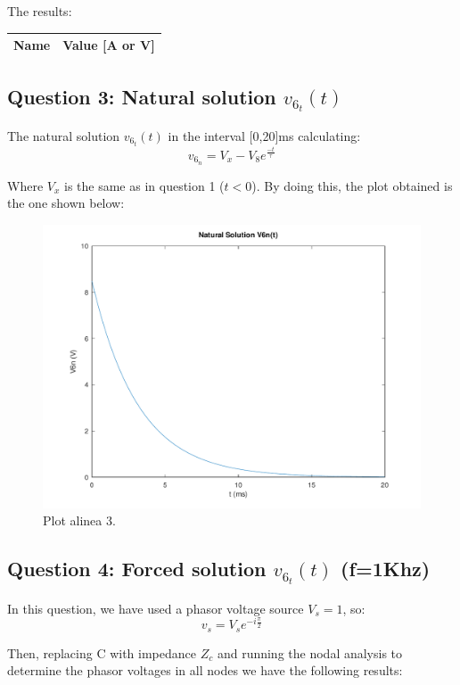 The results:

\begin{center}
  \begin{tabular}{ | c | c | }
    \hline    
    {\bf Name} & {\bf Value [A or V]} \\ \hline
    
    \hline
  \end{tabular}
\end{center}


\subsection{Question 3: Natural solution $v_{6_t}(t)$}
The natural solution $v_{6_t}(t)$ in the interval [0,20]ms calculating:
\begin{equation}
     v_{6_n} = {V_x-V_8}e^{\frac{-t}{\tau}}
\end{equation}\par
Where $V_x$ is the same as in question 1 ($t<0$).
By doing this, the plot obtained is the one shown below:

\begin{figure}[H] \centering
\includegraphics[width=0.7\linewidth]{../mat/alinea3.pdf}
\caption{Plot alinea 3.}
\label{fig:plot3}
\end{figure}


\subsection{Question 4: Forced solution $v_{6_t}(t)$ (f=1Khz)}
In this question, we have used a phasor voltage source $V_s = 1$, so:
\begin{equation}
     v_s = {V_s}e^{-i\frac{\pi}{2}}
\end{equation}\par
Then, replacing C with  impedance $Z_c$ and running the nodal analysis to determine the phasor voltages in all nodes we have the following results:\par

